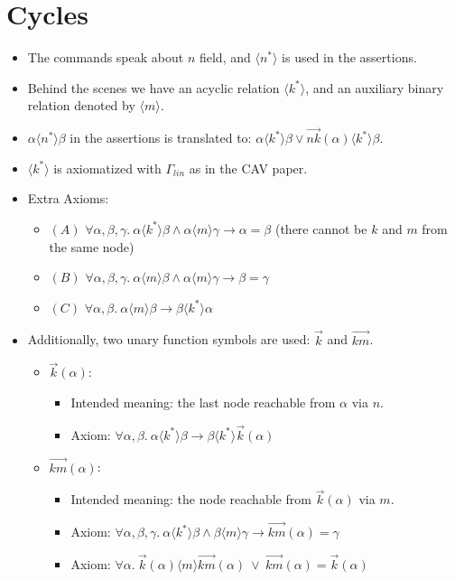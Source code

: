 \documentclass[11pt,a4paper,oneside,draft]{article}
\theoremstyle{definition}
\theoremstyle{remark}
\newcommand{\tup}[1]{{\langle #1 \rangle}}
\begin{document}
\section{Cycles}
\begin{itemize}
\item The commands speak about $n$ field, and $\tup{n^*}$ is used in the assertions.

\item Behind the scenes we have an acyclic relation $\langle k^* \rangle$,
and an auxiliary binary relation denoted by $\tup{m}$.

\item $\alpha \tup{n^*} \beta$ in the assertions is translated to: $\alpha \tup{k^*} \beta \lor \vec{nk}(\alpha) \tup{k^*} \beta$.

\item $\tup{k^*}$ is axiomatized with $\Gamma_{lin}$ as in the CAV paper.
\item Extra Axioms:
\begin{itemize}
\item $(A)$ $\forall \alpha,\beta,\gamma.~ \alpha \tup{k^*} \beta \land \alpha  \tup{m} \gamma \to
\alpha=\beta$
(there cannot be $k$ and $m$ from the same node)
\item $(B)$  $\forall \alpha,\beta,\gamma.~ \alpha \tup{m} \beta \land \alpha \tup{m} \gamma \to
\beta=\gamma$
\item $(C)$  $\forall \alpha,\beta.~ \alpha \tup{m} \beta \to \beta \tup{k^*} \alpha$
\end{itemize}

\item Additionally, two unary function symbols are used: $\vec{k}$ and $\vec{km}$.
\begin{itemize}

\item $\vec{k}( \alpha)$: 
\begin{itemize}
\item Intended meaning: the last node reachable from $ \alpha$ via $n$.
\item Axiom: $\forall \alpha,\beta.~ \alpha \tup{k^*} \beta \to \beta  \tup{k^*} \vec{k}( \alpha)$
\end{itemize}

\item $\vec{km}( \alpha)$: 
\begin{itemize}
\item Intended meaning: the node reachable from $\vec{k}( \alpha)$ via $m$.
\item Axiom: 
$\forall \alpha,\beta,\gamma.~ \alpha \tup{k^*} \beta \land \beta \tup{m} \gamma  \to \vec{km}(\alpha) = \gamma$
\item Axiom: $\forall \alpha.~  \vec{k}(\alpha) \tup{m} \vec{km}(\alpha) ~ \lor ~ \vec{km}(\alpha) = \vec{k}( \alpha)$


\end{itemize}
\end{itemize}
\end{itemize}
\end{document}
